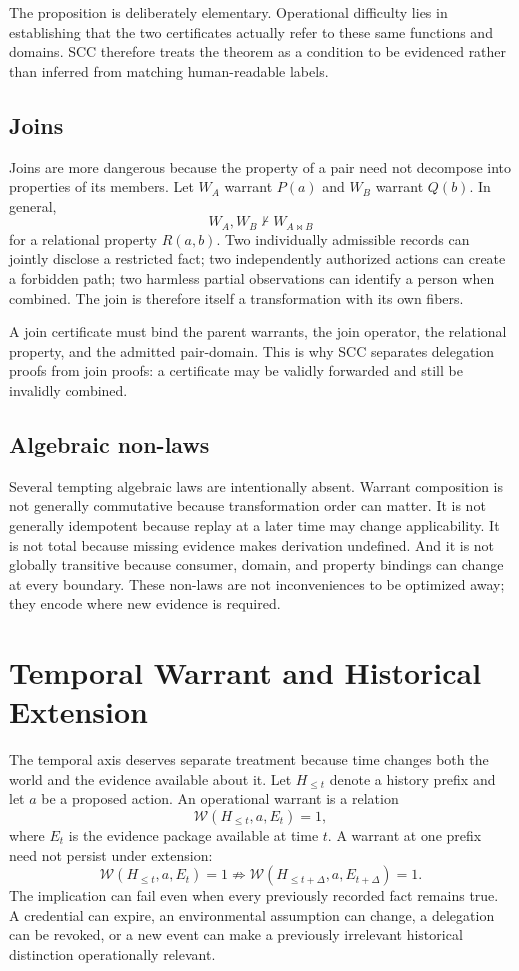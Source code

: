 \documentclass[11pt]{article}
\begin{document}
The proposition is deliberately elementary. Operational difficulty lies in establishing that the two certificates actually refer to these same functions and domains. SCC therefore treats the theorem as a condition to be evidenced rather than inferred from matching human-readable labels.

\subsection{Joins}
Joins are more dangerous because the property of a pair need not decompose into properties of its members. Let $W_A$ warrant $P(a)$ and $W_B$ warrant $Q(b)$. In general,
\[
W_A,W_B\not\vdash W_{A\Join B}
\]
for a relational property $R(a,b)$. Two individually admissible records can jointly disclose a restricted fact; two independently authorized actions can create a forbidden path; two harmless partial observations can identify a person when combined. The join is therefore itself a transformation with its own fibers.

A join certificate must bind the parent warrants, the join operator, the relational property, and the admitted pair-domain. This is why SCC separates delegation proofs from join proofs: a certificate may be validly forwarded and still be invalidly combined.

\subsection{Algebraic non-laws}
Several tempting algebraic laws are intentionally absent. Warrant composition is not generally commutative because transformation order can matter. It is not generally idempotent because replay at a later time may change applicability. It is not total because missing evidence makes derivation undefined. And it is not globally transitive because consumer, domain, and property bindings can change at every boundary. These non-laws are not inconveniences to be optimized away; they encode where new evidence is required.

\section{Temporal Warrant and Historical Extension}
The temporal axis deserves separate treatment because time changes both the world and the evidence available about it. Let $H_{\le t}$ denote a history prefix and let $a$ be a proposed action. An operational warrant is a relation
\[
\mathcal{W}(H_{\le t},a,E_t)=1,
\]
where $E_t$ is the evidence package available at time $t$. A warrant at one prefix need not persist under extension:
\[
\mathcal{W}(H_{\le t},a,E_t)=1
\not\Rightarrow
\mathcal{W}(H_{\le t+\Delta},a,E_{t+\Delta})=1.
\]
The implication can fail even when every previously recorded fact remains true. A credential can expire, an environmental assumption can change, a delegation can be revoked, or a new event can make a previously irrelevant historical distinction operationally relevant.
\end{document}
